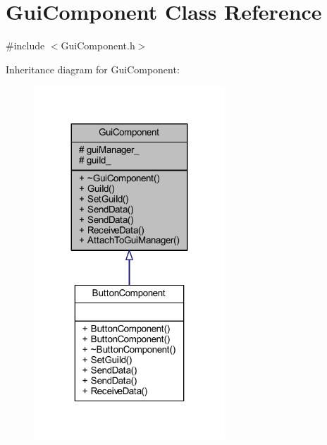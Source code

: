 \hypertarget{class_gui_component}{}\section{Gui\+Component Class Reference}
\label{class_gui_component}


{\ttfamily \#include $<$Gui\+Component.\+h$>$}



Inheritance diagram for Gui\+Component\+:
\nopagebreak
\begin{figure}[H]
\begin{center}
\leavevmode
\includegraphics[width=203pt]{class_gui_component__inherit__graph}
\end{center}
\end{figure}


